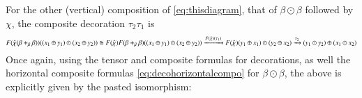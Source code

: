 \documentclass[reqno]{amsart}
\begin{document}
For the other (vertical) composition of \cref{eq:thisdiagram}, that of $\beta\odot\beta$ followed by $\chi$, the composite decoration $\tau_2\tau_1$ is
\begin{displaymath}
\scalebox{.8}{$F(\hat{\chi}(\beta +_\beta \beta))( (x_1 \oplus y_1)\odot (x_2 \oplus y_2))\cong F(\hat{\chi})F(\beta +_\beta \beta)( (x_1 \oplus y_1)\odot (x_2 \oplus y_2)) \xrightarrow{F(\hat{\chi})(\tau_1)}F(\hat{\chi})(y_1\oplus x_1)\odot(y_2\oplus x_2)\xrightarrow{\tau_2}(y_1 \odot y_2) \oplus (x_1 \odot x_2)$}
\end{displaymath}
Once again, using the tensor and composite formulas for decorations, as well the horizontal composite formulas \cref{eq:decohorizontalcompo}
for $\beta\odot\beta$, the above is explicitly given by the pasted isomorphism:
\end{document}
